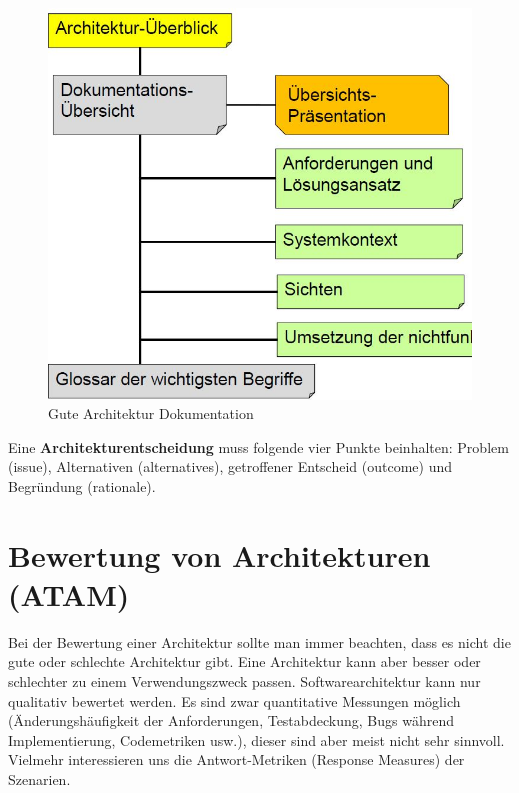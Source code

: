 \begin{figure}[h!]
\centering
\includegraphics[width=0.5\linewidth]{fig/gute-architektur-dokumentation}
\caption{Gute Architektur Dokumentation}
\label{fig:gute-architektur-dokumentation}
\end{figure}

Eine \textbf{Architekturentscheidung} muss folgende vier Punkte beinhalten: Problem (issue), Alternativen (alternatives), getroffener Entscheid (outcome) und Begründung (rationale). 



\section{Bewertung von Architekturen (ATAM)}

Bei der Bewertung einer Architektur sollte man immer beachten, dass es nicht die gute oder schlechte Architektur gibt. Eine Architektur kann aber besser oder schlechter zu einem Verwendungszweck passen. Softwarearchitektur kann nur qualitativ bewertet werden. Es sind zwar quantitative Messungen möglich (Änderungshäufigkeit der Anforderungen, Testabdeckung, Bugs während Implementierung, Codemetriken usw.), dieser sind aber meist nicht sehr sinnvoll. Vielmehr interessieren uns die Antwort-Metriken (Response Measures) der Szenarien.

